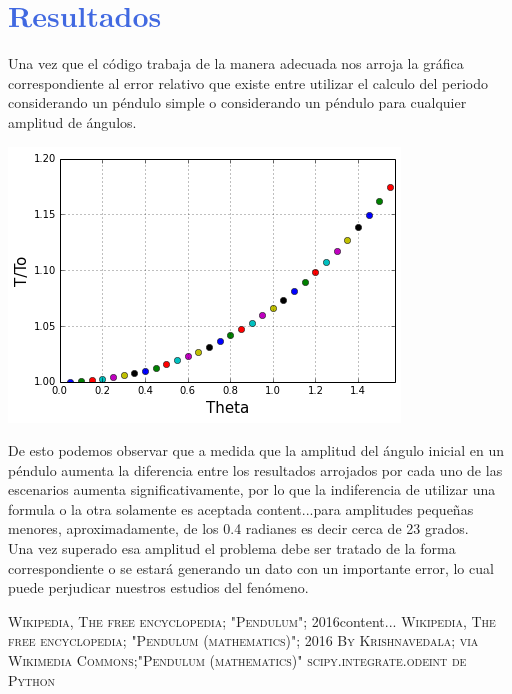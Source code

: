 \documentclass[12pt]{article}
\begin{document}
\pagebreak

\section*{\textcolor{RoyalBlue}{Resultados}}
Una vez que el código trabaja de la manera adecuada nos arroja la gráfica correspondiente al error relativo que existe entre utilizar el calculo del periodo considerando un péndulo simple o considerando un péndulo para cualquier amplitud de ángulos.

\begin{center}
\includegraphics{actividad6.png}
\end{center}

De esto podemos observar que a medida que la amplitud del ángulo inicial en un péndulo aumenta la diferencia entre los resultados arrojados por cada uno de las escenarios aumenta significativamente, por lo que la indiferencia de utilizar una formula o la otra solamente es aceptada {content...}para amplitudes pequeñas menores, aproximadamente, de los 0.4 radianes es decir cerca de 23 grados.\\

Una vez superado esa amplitud el problema debe ser tratado de la forma correspondiente o se estará generando un dato con un importante error, lo cual puede perjudicar nuestros estudios del fenómeno.

\pagebreak
\begin{thebibliography}{X}
  \textsc{Wikipedia, The free encyclopedia; "Pendulum"; 2016}{content...}
  \textsc{Wikipedia, The free encyclopedia; "Pendulum (mathematics)"; 2016}
  \textsc{By Krishnavedala; via Wikimedia Commons;"Pendulum (mathematics)"}
  \textsc{scipy.integrate.odeint de Python}
\end{thebibliography}
\end{document}
